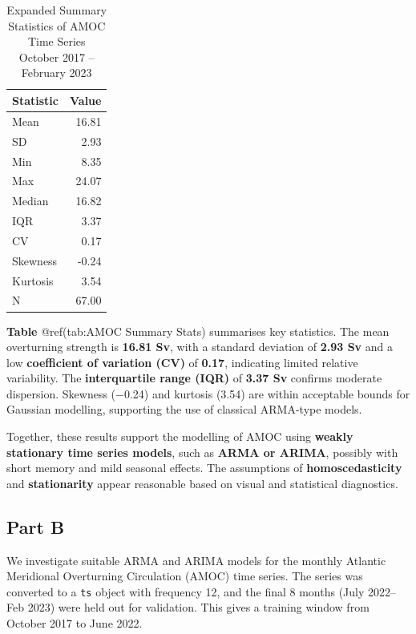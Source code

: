 \documentclass[
  11pt,
]{article}
\begin{document}
\begin{table}
\caption*{
{\large Expanded Summary Statistics of AMOC Time Series} \\ 
{\small October 2017 – February 2023}
} 
\begin{tabular*}{\linewidth}{@{\extracolsep{\fill}}lr}
\toprule
Statistic & Value \\ 
\midrule\addlinespace[2.5pt]
Mean & 16.81 \\ 
SD & 2.93 \\ 
Min & 8.35 \\ 
Max & 24.07 \\ 
Median & 16.82 \\ 
IQR & 3.37 \\ 
CV & 0.17 \\ 
Skewness & -0.24 \\ 
Kurtosis & 3.54 \\ 
N & 67.00 \\ 
\bottomrule
\end{tabular*}
\end{table}

\textbf{Table} @ref(tab:AMOC Summary Stats) summarises key statistics.
The mean overturning strength is \textbf{16.81 Sv}, with a standard
deviation of \textbf{2.93 Sv} and a low \textbf{coefficient of variation
(CV)} of \textbf{0.17}, indicating limited relative variability. The
\textbf{interquartile range (IQR)} of \textbf{3.37 Sv} confirms moderate
dispersion. Skewness (−0.24) and kurtosis (3.54) are within acceptable
bounds for Gaussian modelling, supporting the use of classical ARMA-type
models.

Together, these results support the modelling of AMOC using
\textbf{weakly stationary time series models}, such as \textbf{ARMA or
ARIMA}, possibly with short memory and mild seasonal effects. The
assumptions of \textbf{homoscedasticity} and \textbf{stationarity}
appear reasonable based on visual and statistical diagnostics.

\subsection{Part B}\label{part-b}

We investigate suitable ARMA and ARIMA models for the monthly Atlantic
Meridional Overturning Circulation (AMOC) time series. The series was
converted to a \texttt{ts} object with frequency 12, and the final 8
months (July 2022--Feb 2023) were held out for validation. This gives a
training window from October 2017 to June 2022.
\end{document}
